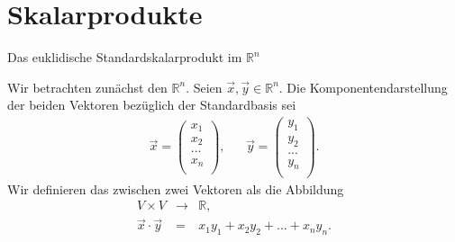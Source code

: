 \documentclass[german]{beamer}
\newcommand{\superalert}[1]{{\color{MyYellowOrange}{#1}}}
\newcommand{\bq}{\begin{eqnarray*}}
\newcommand{\eq}{\end{eqnarray*}}
\begin{document}

\section{Skalarprodukte}

\frame{\sectionpage}

\begin{frame}{Das euklidische Standardskalarprodukt im ${\mathbb R}^n$}

Wir betrachten zun\"achst den \alert{${\mathbb R}^n$}. Seien $\vec{x}, \vec{y} \in {\mathbb R}^n$.
Die Komponentendarstellung der beiden Vektoren bez\"uglich der Standardbasis sei
\bq
 \vec{x} =  \left( \begin{array}{c} x_1 \\ x_2 \\ ... \\ x_n \\ \end{array} \right),
 & &
 \vec{y} =  \left( \begin{array}{c} y_1 \\ y_2 \\ ... \\ y_n \\ \end{array} \right).
\eq
Wir definieren das \superalert{euklidische Standardskalarprodukt} zwischen zwei Vektoren als die Abbildung
\bq
 V \times V & \rightarrow & {\mathbb R},
 \nonumber \\
 \vec{x} \cdot \vec{y} & = & x_1 y_1 + x_2 y_2 + ... + x_n y_n.
\eq

\end{frame}
\end{document}
